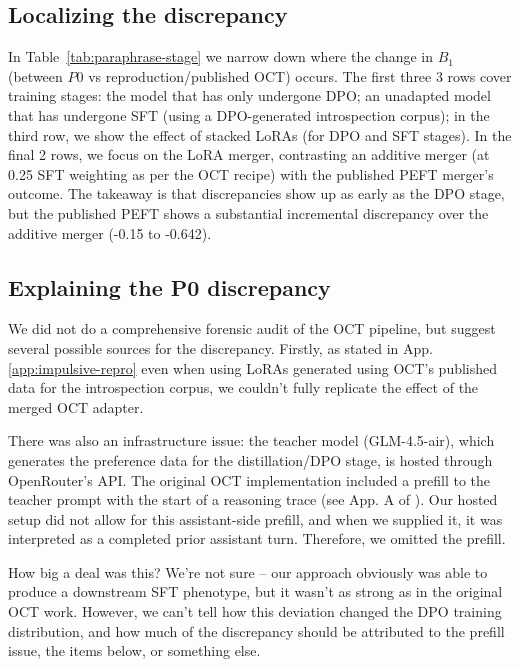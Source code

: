 \documentclass[11pt]{article}
\begin{document}
\subsection{Localizing the discrepancy}
In Table~\ref{tab:paraphrase-stage} we narrow down where the change in $B_1$ (between $P0$ vs reproduction/published OCT) occurs. The first three 3 rows cover training stages: the model that has only undergone DPO; an unadapted model that has undergone SFT (using a DPO-generated introspection corpus); in the third row, we show the effect of stacked LoRAs (for DPO and SFT stages). In the final 2 rows, we focus on the LoRA merger, contrasting an additive merger (at 0.25 SFT weighting as per the OCT recipe) with the published PEFT merger's outcome. The takeaway is that discrepancies show up as early as the DPO stage, but the published PEFT shows a substantial incremental discrepancy over the additive merger (-0.15 to -0.642).





\subsection{Explaining the P0 discrepancy}

We did not do a comprehensive forensic audit of the OCT pipeline, but suggest several possible sources for the discrepancy. Firstly, as stated in App.\ref{app:impulsive-repro} even when using LoRAs generated using OCT's published data for the introspection corpus, we couldn't fully replicate the effect of the merged OCT adapter.

There was also an infrastructure issue: the teacher model (GLM-4.5-air), which generates the preference data for the distillation/DPO stage, is hosted through OpenRouter's API. The original OCT implementation included a prefill to the teacher prompt with the start of a reasoning trace (see App. A of \citep{maiya2025opencharactertrainingshaping}). Our hosted setup did not allow for this assistant-side prefill, and when we supplied it, it was interpreted as a completed prior assistant turn. Therefore, we omitted the prefill. 

How big a deal was this? We're not sure -- our approach obviously was able to produce a downstream SFT phenotype, but it wasn't as strong as in the original OCT work. However, we can't tell how this deviation changed the DPO training distribution, and how much of the discrepancy should be attributed to the prefill issue, the items below, or something else.
\end{document}
